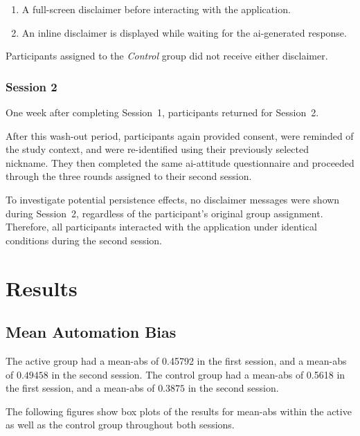 \documentclass[sigconf,natbib=false]{acmart}
\begin{document}
\begin{enumerate}
\item A full-screen disclaimer before interacting with the application.
\item An inline disclaimer is displayed while waiting for the \Gls{ai}-generated response.
\end{enumerate}

Participants assigned to the \textit{Control} group did not receive either disclaimer.

 \subsubsection{Session 2}

One week after completing Session~1, participants returned for Session~2.

After this wash-out period, participants again provided consent, were reminded of the study context, and were re-identified using their previously selected nickname.
They then completed the same \Gls{ai}-attitude questionnaire and proceeded through the three rounds assigned to their second session.

To investigate potential persistence effects, no disclaimer messages were shown during Session~2, regardless of the participant's original group assignment.
Therefore, all participants interacted with the application under identical conditions during the second session.













\section{Results}

\subsection{Mean Automation Bias}

The active group had a \gls{mean-abs} of 0.45792 in the first session, and a \gls{mean-abs} of $0.49458$ in the second session. The control group had a \gls{mean-abs} of 0.5618 in the first session, and a \gls{mean-abs} of $0.3875$ in the second session.

The following figures show box plots of the results for \acrfull{mean-abs} within the active as well as the control group throughout both sessions.
\end{document}
